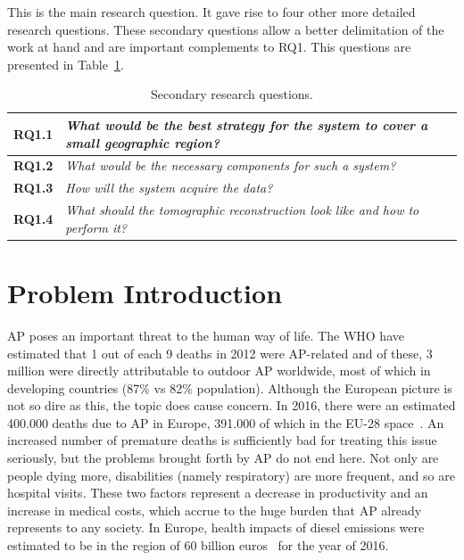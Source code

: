 This is the main research question. It gave rise to four other more
detailed research questions. These secondary questions allow a better
delimitation of the work at hand and are important complements to RQ1.
This questions are presented in Table~\ref{tab:sec_RQ}.

\begin{table}[htpb]
    \centering
    \caption{Secondary research questions.}
    \label{tab:sec_RQ}
    \begin{tabularx}{0.8\textwidth}{cX}
        \toprule
        \textbf{RQ1.1}&\emph{ What would be the best strategy
        for the system to cover a small geographic region? }\\
        \midrule
        \textbf{RQ1.2}&\emph{ What would be the necessary
        components for such a system? }\\
        \midrule
        \textbf{RQ1.3}&\emph{ How will the system acquire the
        data? }\\
        \midrule
        \textbf{RQ1.4}&\emph{ What should the tomographic
        reconstruction look like and how to perform it? }\\
        \bottomrule
    \end{tabularx}
\end{table}

\section{Problem Introduction}%
\label{sec:problem_introduction}

\acrlong{AP} poses an important threat to the human way of life. The
\gls{WHO} have estimated that 1 out of each 9 deaths in 2012 were
\gls{AP}-related and of these, 3 million were directly attributable to
outdoor \gls{AP} worldwide, most of which in developing countries (87\%
vs 82\% population). Although the European picture is not so dire as
this, the topic does cause concern. In 2016, there were an estimated
400.000 deaths due to \gls{AP} in Europe, 391.000 of which in the EU-28
space~\cite{Guerreiro2019}. An increased number of premature deaths is
sufficiently bad for treating this issue seriously, but the problems
brought forth by \acrlong{AP} do not end here. Not only are people dying
more, disabilities (namely respiratory) are more frequent, and so are
hospital visits. These two factors represent a decrease in productivity
and an increase in medical costs, which accrue to the huge burden that
\gls{AP} already represents to any society. In Europe, health impacts of
diesel emissions were estimated to be in the region of 60 billion
euros~\cite{CEDelft2018} for the year of 2016.

